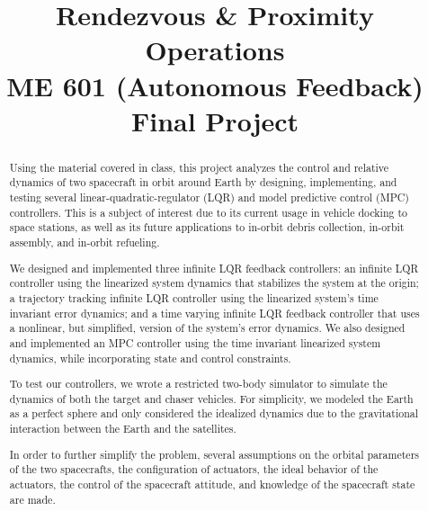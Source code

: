 \documentclass[conference]{IEEEtran}
\begin{document}
\newcommand\todo[1]{\textcolor{red}{\textbf{#1}}}
\newcommand\mat[1]{\begin{bmatrix}#1\end{bmatrix}}

\title{Rendezvous \& Proximity Operations \\
{\footnotesize ME 601 (Autonomous Feedback) Final Project}
}

\author{
}




\maketitle

\begin{abstract}

Using the material covered in class, this project analyzes the control and
relative dynamics of two spacecraft in orbit around Earth by designing,
implementing, and testing several linear-quadratic-regulator (LQR) and model
predictive control (MPC) controllers. This is a subject of interest due to its
current usage in vehicle docking to space stations, as well as its future
applications to in-orbit debris collection, in-orbit assembly, and in-orbit
refueling.

We designed and implemented three infinite LQR feedback controllers: an
infinite LQR controller using the linearized system dynamics that stabilizes
the system at the origin; a trajectory tracking infinite LQR controller using
the linearized system's time invariant error dynamics; and a time varying
infinite LQR feedback controller that uses a nonlinear, but simplified, version
of the system's error dynamics. We also designed and implemented an MPC
controller using the time invariant linearized system dynamics, while
incorporating state and control constraints.

To test our controllers, we wrote a restricted two-body simulator to simulate
the dynamics of both the target and chaser vehicles. For simplicity, we modeled
the Earth as a perfect sphere and only considered the idealized dynamics due to
the gravitational interaction between the Earth and the satellites.

In order to further simplify the problem, several assumptions on the orbital
parameters of the two spacecrafts, the configuration of actuators, the ideal
behavior of the actuators, the control of the spacecraft attitude, and
knowledge of the spacecraft state are made.

\end{abstract}
\end{document}
